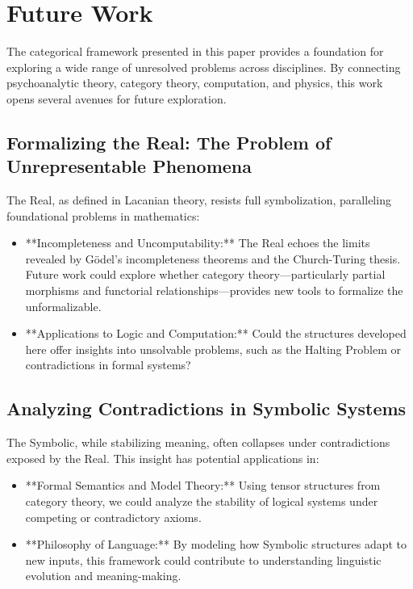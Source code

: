 \documentclass{article}
\begin{document}
\section{Future Work}

The categorical framework presented in this paper provides a foundation for exploring a wide range of unresolved problems across disciplines. By connecting psychoanalytic theory, category theory, computation, and physics, this work opens several avenues for future exploration.

\subsection{Formalizing the Real: The Problem of Unrepresentable Phenomena}

The Real, as defined in Lacanian theory, resists full symbolization, paralleling foundational problems in mathematics:
\begin{itemize}
    \item **Incompleteness and Uncomputability:** The Real echoes the limits revealed by Gödel’s incompleteness theorems and the Church-Turing thesis. Future work could explore whether category theory—particularly partial morphisms and functorial relationships—provides new tools to formalize the unformalizable.
    \item **Applications to Logic and Computation:** Could the structures developed here offer insights into unsolvable problems, such as the Halting Problem or contradictions in formal systems?
\end{itemize}

\subsection{Analyzing Contradictions in Symbolic Systems}

The Symbolic, while stabilizing meaning, often collapses under contradictions exposed by the Real. This insight has potential applications in:
\begin{itemize}
    \item **Formal Semantics and Model Theory:** Using tensor structures from category theory, we could analyze the stability of logical systems under competing or contradictory axioms.
    \item **Philosophy of Language:** By modeling how Symbolic structures adapt to new inputs, this framework could contribute to understanding linguistic evolution and meaning-making.
\end{itemize}
\end{document}
